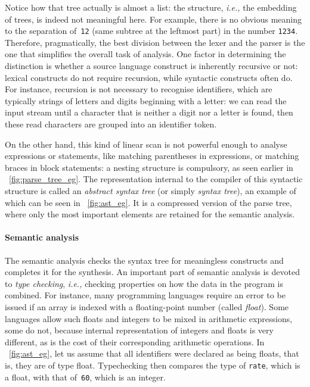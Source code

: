 Notice how that tree actually is almost a list: the structure,
\emph{i.e.,} the embedding of trees, is indeed not meaningful
here. For example, there is no obvious meaning to the separation
of~\texttt{12} (same subtree at the leftmost part) in the number
\texttt{1234}. Therefore, pragmatically, the best division between the
lexer and the parser is the one that simplifies the overall task of
analysis. One factor in determining the distinction is whether a
source language construct is inherently recursive or not: lexical
constructs do not require recursion, while syntactic constructs often
do. For instance, recursion is not necessary to recognise identifiers,
which are typically strings of letters and digits beginning with a
letter: we can read the input stream until a character that is neither
a digit nor a letter is found, then these read characters are grouped
into an identifier token.

On the other hand, this kind of linear scan is not powerful enough to
analyse expressions or statements, like matching parentheses in
expressions, or matching braces in block statements: a nesting
structure is compulsory, as seen earlier
in \fig~\vref{fig:parse_tree_eg}. The
representation internal to the compiler of this syntactic structure is
called an \emph{abstract syntax tree} (or simply
\emph{syntax tree}), an example of which can be seen in
\fig~\vref{fig:ast_eg}. It is a compressed version of the parse tree, where
only the most important elements are retained for the semantic
analysis.

\paragraph{Semantic analysis}

The semantic analysis checks the syntax tree for meaningless
constructs and completes it for the synthesis. An important part of
semantic analysis is devoted to \emph{type checking}, \emph{i.e.,}
checking properties on how the data in the program is combined. For
instance, many programming languages require an error to be issued if
an array is indexed with a floating-point number (called
\emph{float}). Some languages allow such floats and integers to be
mixed in arithmetic expressions, some do not, because internal
representation of integers and floats is very different, as is the
cost of their corresponding arithmetic operations. In
\fig~\vref{fig:ast_eg}, let us assume that all identifiers were declared as
being floats, that is, they are of type float. Typechecking then
compares the type of \texttt{rate}, which is a float, with that
of~\texttt{60}, which is an integer.

